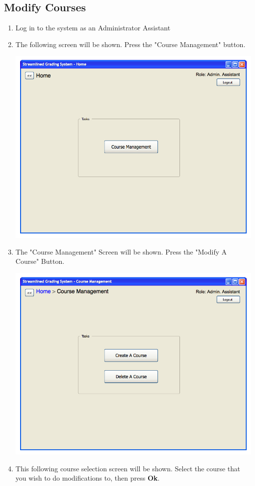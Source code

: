 \documentclass{article}
\begin{document}
\subsection{Modify Courses}
\begin{enumerate}
 \item Log in to the system as an Administrator Assistant
 \item The following screen will be shown. Press the "Course Management" button.
   \centerline{\includegraphics[scale=0.55]{../images/UIMockups/pngs/adminassisthomepage}}
 \item The "Course Management" Screen will be shown.
   Press the "Modify A Course" Button.
   \centerline{\includegraphics[scale=0.55]{../images/UIMockups/pngs/Coursemanagement}}
 \item This following course selection screen will be shown. Select the course
   that you wish to do modifications to, then press \textbf{Ok}.


\end{enumerate}
\end{document}
